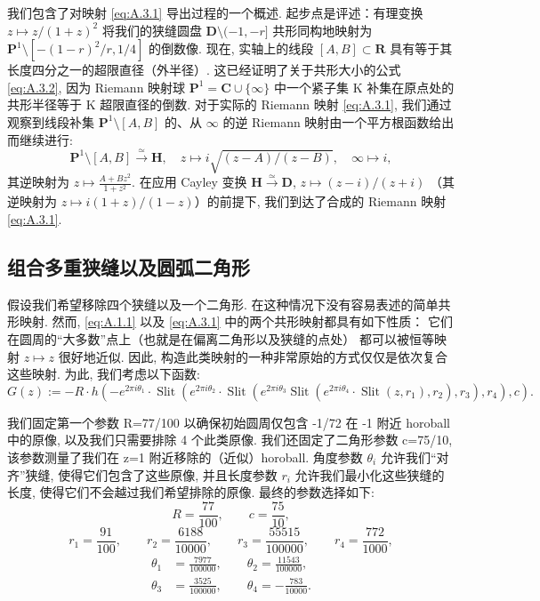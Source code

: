 我们包含了对映射 \eqref{eq:A.3.1} 导出过程的一个概述. 
起步点是评述：有理变换 \(z \mapsto z/(1+z)^2\) 将我们的狭缝圆盘 \(\mathbf{D} \setminus (-1, -r]\) 
共形同构地映射为 \(\mathbf{P}^1 \setminus [-(1-r)^2/r, 1/4]\) 的倒数像. 
现在, 实轴上的线段 \([A, B] \subset \mathbf{R}\) 具有等于其长度四分之一的超限直径（外半径）. 
这已经证明了关于共形大小的公式 \eqref{eq:A.3.2}, 
因为 Riemann 映射球 \(\mathbf{P}^1 = \mathbf{C} \cup \{\infty\}\) 
中一个紧子集 K 补集在原点处的共形半径等于 K 超限直径的倒数. 
对于实际的 Riemann 映射 \eqref{eq:A.3.1}, 
我们通过观察到线段补集 \(\mathbf{P}^1 \setminus [A, B]\) 的、从 \(\infty\) 的逆 Riemann 映射由一个平方根函数给出而继续进行:
\[ \mathbf{P}^1 \setminus [A, B] \xrightarrow{\simeq} \mathbf{H}, \quad z \mapsto i\sqrt{(z-A)/(z-B)}, \quad \infty \mapsto i, \]
其逆映射为 \(z \mapsto \frac{A+Bz^2}{1+z^2}\). 
在应用 Cayley 变换 \(\mathbf{H} \xrightarrow{\simeq} \mathbf{D}\), \(z \mapsto (z-i)/(z+i)\) （其逆映射为 \(z \mapsto i(1+z)/(1-z)\)）的前提下, 
我们到达了合成的 Riemann 映射 \eqref{eq:A.3.1}.

\subsection{组合多重狭缝以及圆弧二角形}\label{sec:A.4}

假设我们希望移除四个狭缝以及一个二角形. 
在这种情况下没有容易表述的简单共形映射. 
然而, \eqref{eq:A.1.1} 以及 \eqref{eq:A.3.1} 中的两个共形映射都具有如下性质： 
它们在圆周的“大多数”点上（也就是在偏离二角形以及狭缝的点处） 
都可以被恒等映射 \(z \mapsto z\) 很好地近似. 
因此, 构造此类映射的一种非常原始的方式仅仅是依次复合这些映射. 
为此, 我们考虑以下函数:
\[ G(z) := -R \cdot h\left(-e^{2\pi i\theta_1} \cdot \operatorname{Slit}\left(e^{2\pi i\theta_2} \cdot \operatorname{Slit}\left(e^{2\pi i\theta_3} \operatorname{Slit}\left(e^{2\pi i\theta_4} \cdot \operatorname{Slit}\left(z, r_1\right), r_2\right), r_3\right), r_4\right), c\right). \]

我们固定第一个参数 R=77/100 以确保初始圆周仅包含 -1/72 在 -1 附近 horoball 中的原像, 
以及我们只需要排除 4 个此类原像. 
我们还固定了二角形参数 c=75/10, 该参数测量了我们在 z=1 附近移除的（近似）horoball. 
角度参数 \(\theta_i\) 允许我们“对齐”狭缝, 
使得它们包含了这些原像, 
并且长度参数 \(r_i\) 允许我们最小化这些狭缝的长度, 
使得它们不会越过我们希望排除的原像. 
最终的参数选择如下:
\[ R = \frac{77}{100}, \qquad c = \frac{75}{10}, \]
\[ r_1 = \frac{91}{100}, \qquad r_2 = \frac{6188}{10000}, \qquad r_3 = \frac{55515}{100000}, \qquad r_4 = \frac{772}{1000}, \]
\begin{equation}\label{eq:A.4.1}
\begin{aligned}
\theta_1 &= \frac{7977}{100000}, \qquad \theta_2 = \frac{11543}{100000}, \\
\theta_3 &= \frac{3525}{100000}, \qquad \theta_4 = -\frac{783}{10000}.
\end{aligned}
\end{equation}


